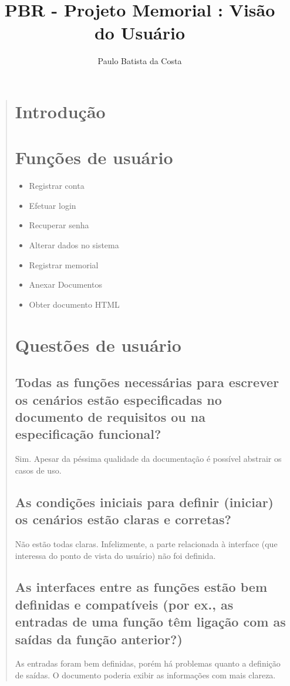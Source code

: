 \documentclass[12pt,a4paper]{report}
\author{Paulo Batista da Costa}
\title{PBR - Projeto Memorial : Visão do Usuário}
\begin{document}
\maketitle
\tableofcontents
\begin{quotation}
\newpage
\section{Introdução}
\section{Funções de usuário}
\begin{itemize}
\item Registrar conta
\item Efetuar login
\item Recuperar senha
\item Alterar dados no sistema
\item Registrar memorial
\item Anexar Documentos
\item Obter documento HTML
\end{itemize}
\section{Questões de usuário}
\subsection{Todas as funções necessárias para escrever os cenários estão especificadas no documento de requisitos ou na especificação funcional?}
Sim. Apesar da péssima qualidade da documentação é possível abstrair os casos de uso.
\subsection{As condições iniciais para definir (iniciar) os cenários estão claras e corretas?}
Não estão todas claras. Infelizmente, a parte relacionada à interface (que interessa do ponto de vista do usuário) não foi definida.
\subsection{As interfaces entre as funções estão bem definidas e compatíveis (por ex., as entradas de uma função têm ligação com as saídas da função anterior?)}
As entradas foram bem definidas, porém há problemas quanto a definição de saídas. O documento poderia exibir as informações com mais clareza.

\end{quotation}
\end{document}
